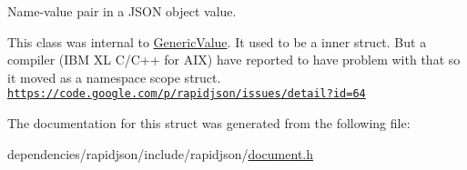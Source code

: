 Name-\/value pair in a J\+S\+ON object value. 

This class was internal to \hyperlink{class_generic_value}{Generic\+Value}. It used to be a inner struct. But a compiler (I\+BM XL C/\+C++ for A\+IX) have reported to have problem with that so it moved as a namespace scope struct. \href{https://code.google.com/p/rapidjson/issues/detail?id=64}{\tt https\+://code.\+google.\+com/p/rapidjson/issues/detail?id=64} 

The documentation for this struct was generated from the following file\+:\begin{DoxyCompactItemize}
\item 
dependencies/rapidjson/include/rapidjson/\hyperlink{document_8h}{document.\+h}\end{DoxyCompactItemize}
